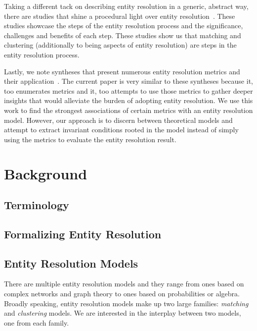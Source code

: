 \documentclass[journal]{IEEEtran}
\begin{document}
    Taking a different tack on describing entity resolution in a generic,
    abstract way, there are studies that shine a procedural light over entity
    resolution~\cite{Pap19,Chen09}.
    These studies showcase the steps of the entity resolution process and the
    significance, challenges and benefits of each step.
    These studies show us that matching and clustering (additionally to being
    aspects of entity resolution) are steps in the entity resolution process.

    Lastly, we note syntheses that present numerous entity resolution metrics
    and their application~\cite{hitesh2012,graf2021frost,barnes2015practioner}.
    The current paper is very similar to these syntheses because it, too
    enumerates metrics and it, too attempts to use those metrics to gather
    deeper insights that would alleviate the burden of adopting entity
    resolution.
    We use this work to find the strongest associations of certain metrics with
    an entity resolution model.
    However, our approach is to discern between theoretical models and attempt
    to extract invariant conditions rooted in the model instead of simply using
    the metrics to evaluate the entity resolution result.

    \section{Background}\label{sec:Theoretical Background}
    \subsection{Terminology}\label{sec:Terminology}
    
    
    \subsection{Formalizing Entity Resolution}\label{sec:Entity Resolution Formalization}
    

    \subsection{Entity Resolution Models}\label{subsec:Entity Resolution Models}

    There are multiple entity resolution models and they range from ones based
    on complex networks and graph theory\cite{Li2020} to ones based on
    probabilities\cite{fs1969} or algebra\cite{Tal11,Ben2009Swoosh}.
    Broadly speaking, entity resolution models make up two large families:
    \textit{matching} and \textit{clustering} models.
    We are interested in the interplay between two models, one from each family.
\end{document}
